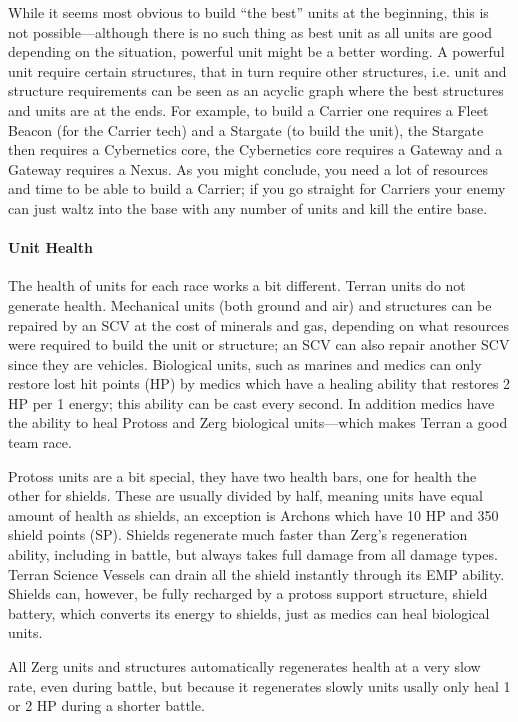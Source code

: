 While it seems most obvious to build “the best” units at the beginning, this is not possible—although there is no such thing as best unit as all units are good depending on the situation, powerful unit might be a better wording. A powerful unit require certain structures, that in turn require other structures, i.e. unit and structure requirements can be seen as an acyclic graph  where the best structures and units are at the ends. For example, to build a Carrier one requires a Fleet Beacon (for the Carrier tech) and a Stargate (to build the unit), the Stargate then requires a Cybernetics core, the Cybernetics core requires a Gateway and a Gateway requires a Nexus. As you might conclude, you need a lot of resources and time to be able to build a Carrier; if you go straight for Carriers your enemy can just waltz into the base with any number of units and kill the entire base.

\paragraph{Unit Health}
The health of units for each race works a bit different. Terran units do not generate health. Mechanical units (both ground and air) and structures can be repaired by an SCV at the cost of minerals and gas, depending on what resources were required to build the unit or structure; an SCV can also repair another SCV since they are vehicles. Biological units, such as marines and medics can only restore lost hit points (HP) by medics which have a healing ability that restores 2 HP per 1 energy; this ability can be cast every second. In addition medics have the ability to heal Protoss and Zerg biological units—which makes Terran a good team race.

Protoss units are a bit special, they have two health bars, one for health the other for shields. These are usually divided by half, meaning units have equal amount of health as shields, an exception is Archons which have 10 HP and 350 shield points (SP). Shields regenerate much faster than Zerg’s regeneration ability, including in battle, but always takes full damage from all damage types. Terran Science Vessels can drain all the shield instantly through its EMP ability. Shields can, however, be fully recharged by a protoss support structure, shield battery, which converts its energy to shields, just as medics can heal biological units.

All Zerg units and structures automatically regenerates health at a very slow rate, even during battle, but because it regenerates slowly units usally only heal 1 or 2 HP during a shorter battle.

